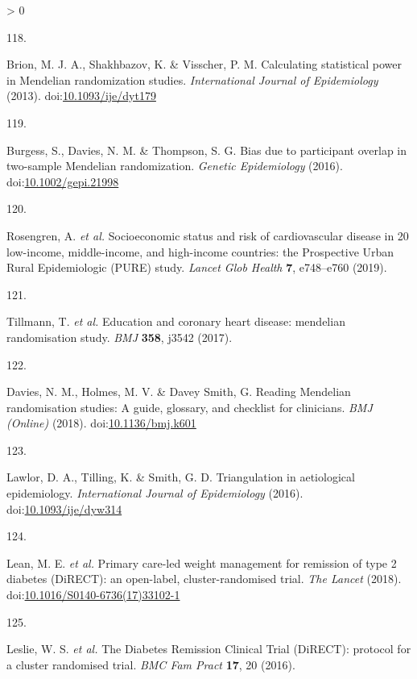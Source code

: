 \documentclass[11pt,twoside]{bristolthesis}
\newlength{\cslhangindent}
\newlength{\csllabelwidth}
\newenvironment{CSLReferences}[2] %
 {%
  \setlength{\parindent}{0pt}
  \ifodd #1 \everypar{\setlength{\hangindent}{\cslhangindent}}\ignorespaces\fi
  \ifnum #2 > 0
  \setlength{\parskip}{#2\baselineskip}
  \fi
 }%
 {}
\newcommand{\CSLLeftMargin}[1]{\parbox[t]{\csllabelwidth}{#1}}
\newcommand{\CSLRightInline}[1]{\parbox[t]{\linewidth - \csllabelwidth}{#1}\break}
\begin{document}
\begin{CSLReferences}{0}{0}
\leavevmode\hypertarget{ref-Brion2013}{}%
\CSLLeftMargin{118. }
\CSLRightInline{Brion, M. J. A., Shakhbazov, K. \& Visscher, P. M. {Calculating statistical power in Mendelian randomization studies}. \emph{International Journal of Epidemiology} (2013). doi:\href{https://doi.org/10.1093/ije/dyt179}{10.1093/ije/dyt179}}

\leavevmode\hypertarget{ref-Burgess2016}{}%
\CSLLeftMargin{119. }
\CSLRightInline{Burgess, S., Davies, N. M. \& Thompson, S. G. {Bias due to participant overlap in two-sample Mendelian randomization}. \emph{Genetic Epidemiology} (2016). doi:\href{https://doi.org/10.1002/gepi.21998}{10.1002/gepi.21998}}

\leavevmode\hypertarget{ref-Rosengren2019}{}%
\CSLLeftMargin{120. }
\CSLRightInline{Rosengren, A. \emph{et al.} {Socioeconomic status and risk of cardiovascular disease in 20 low-income, middle-income, and high-income countries: the Prospective Urban Rural Epidemiologic (PURE) study}. \emph{Lancet Glob Health} \textbf{7}, e748--e760 (2019).}

\leavevmode\hypertarget{ref-Tillmann2017}{}%
\CSLLeftMargin{121. }
\CSLRightInline{Tillmann, T. \emph{et al.} {Education and coronary heart disease: mendelian randomisation study}. \emph{BMJ} \textbf{358}, j3542 (2017).}

\leavevmode\hypertarget{ref-Davies2018}{}%
\CSLLeftMargin{122. }
\CSLRightInline{Davies, N. M., Holmes, M. V. \& Davey Smith, G. {Reading Mendelian randomisation studies: A guide, glossary, and checklist for clinicians}. \emph{BMJ (Online)} (2018). doi:\href{https://doi.org/10.1136/bmj.k601}{10.1136/bmj.k601}}

\leavevmode\hypertarget{ref-Lawlor2016}{}%
\CSLLeftMargin{123. }
\CSLRightInline{Lawlor, D. A., Tilling, K. \& Smith, G. D. {Triangulation in aetiological epidemiology}. \emph{International Journal of Epidemiology} (2016). doi:\href{https://doi.org/10.1093/ije/dyw314}{10.1093/ije/dyw314}}

\leavevmode\hypertarget{ref-Lean2018}{}%
\CSLLeftMargin{124. }
\CSLRightInline{Lean, M. E. \emph{et al.} {Primary care-led weight management for remission of type 2 diabetes (DiRECT): an open-label, cluster-randomised trial}. \emph{The Lancet} (2018). doi:\href{https://doi.org/10.1016/S0140-6736(17)33102-1}{10.1016/S0140-6736(17)33102-1}}

\leavevmode\hypertarget{ref-Leslie2016}{}%
\CSLLeftMargin{125. }
\CSLRightInline{Leslie, W. S. \emph{et al.} {The Diabetes Remission Clinical Trial (DiRECT): protocol for a cluster randomised trial}. \emph{BMC Fam Pract} \textbf{17}, 20 (2016).}


\end{CSLReferences}
\end{document}
